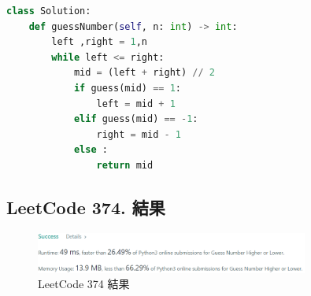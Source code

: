 \documentclass[10pt,UTF8]{ctexart}
\begin{document}
\begin{lstlisting}[language={python}]
class Solution:
    def guessNumber(self, n: int) -> int:
        left ,right = 1,n
        while left <= right:
            mid = (left + right) // 2
            if guess(mid) == 1:
                left = mid + 1
            elif guess(mid) == -1:
                right = mid - 1
            else :
                return mid
\end{lstlisting}

\subsection{LeetCode 374. 結果}

\begin{figure}[H]
\centering 
\includegraphics[width=0.80\textwidth]{lc-374-o.png} 
\caption{LeetCode 374 結果}
\label{Test}
\end{figure}










\clearpage
\end{document}
